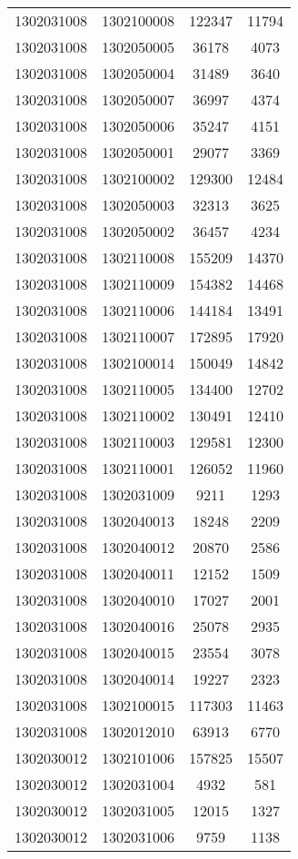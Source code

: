 \begin{longtable}[h]{llcc}
		1302031008 & 1302100008 & 122347 & 11794\\
		1302031008 & 1302050005 & 36178 & 4073\\
		1302031008 & 1302050004 & 31489 & 3640\\
		1302031008 & 1302050007 & 36997 & 4374\\
		1302031008 & 1302050006 & 35247 & 4151\\
		1302031008 & 1302050001 & 29077 & 3369\\
		1302031008 & 1302100002 & 129300 & 12484\\
		1302031008 & 1302050003 & 32313 & 3625\\
		1302031008 & 1302050002 & 36457 & 4234\\
		1302031008 & 1302110008 & 155209 & 14370\\
		1302031008 & 1302110009 & 154382 & 14468\\
		1302031008 & 1302110006 & 144184 & 13491\\
		1302031008 & 1302110007 & 172895 & 17920\\
		1302031008 & 1302100014 & 150049 & 14842\\
		1302031008 & 1302110005 & 134400 & 12702\\
		1302031008 & 1302110002 & 130491 & 12410\\
		1302031008 & 1302110003 & 129581 & 12300\\
		1302031008 & 1302110001 & 126052 & 11960\\
		1302031008 & 1302031009 & 9211 & 1293\\
		1302031008 & 1302040013 & 18248 & 2209\\
		1302031008 & 1302040012 & 20870 & 2586\\
		1302031008 & 1302040011 & 12152 & 1509\\
		1302031008 & 1302040010 & 17027 & 2001\\
		1302031008 & 1302040016 & 25078 & 2935\\
		1302031008 & 1302040015 & 23554 & 3078\\
		1302031008 & 1302040014 & 19227 & 2323\\
		1302031008 & 1302100015 & 117303 & 11463\\
		1302031008 & 1302012010 & 63913 & 6770\\
		1302030012 & 1302101006 & 157825 & 15507\\
		1302030012 & 1302031004 & 4932 & 581\\
		1302030012 & 1302031005 & 12015 & 1327\\
		1302030012 & 1302031006 & 9759 & 1138\\

\end{longtable}
